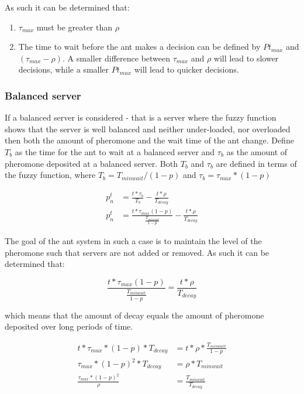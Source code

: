 As such it can be determined that:

\begin{enumerate}
	\item $\tau_{max}$ must be greater than $\rho$
	\item The time to wait before the ant makes a decision can be defined by $Pt_{max}$ and $(\tau_{max} - \rho)$. A smaller difference between $\tau_{max}$ and $\rho$ will lead to slower decisions, while a smaller $Pt_{max}$ will lead to quicker decisions.
\end{enumerate}

\subsubsection{Balanced server}

If a balanced server is considered - that is a server where the fuzzy function shows that the server is well balanced and neither under-loaded, nor overloaded then both the amount of pheromone and the wait time of the ant change. Define $T_{b}$ as the time for the ant to wait at a balanced server and $\tau_{b}$ as the amount of pheromone deposited at a balanced server. Both $T_{b}$ and $\tau_{b}$ are defined in terms of the fuzzy function, where $T_{b} = T_{minwait} / (1 - p)$ and $\tau_{b} = \tau_{max} * (1 - p)$

\begin{equation}
\begin{aligned}
p^{t}_{n} &= \frac{t *  \tau_{b}}{T_{b}} - \frac{t *  \rho}{T_{decay}} \\
p^{t}_{n} &= \frac{t *  \tau_{max}(1 - p)}{\frac{T_{minwait}}{1 - p}} - \frac{t *  \rho}{T_{decay}}
\end{aligned}
\end{equation}

The goal of the ant system in such a case is to maintain the level of the pheromone such that servers are not added or removed. As such it can be determined that:

\begin{equation}
\frac{t *  \tau_{max}(1 - p)}{\frac{T_{minwait}}{1 - p}} = \frac{t *  \rho}{T_{decay}}
\end{equation}

which means that the amount of decay equals the amount of pheromone deposited over long periods of time.

\begin{equation}
\begin{aligned}
t *  \tau_{max} * (1 - p) * T_{decay} &= t *  \rho * \frac{T_{minwait}}{1 - p} \\
\tau_{max} * (1 - p)^2 * T_{decay} &= \rho * T_{minwait} \\
\frac{\tau_{max} * (1 - p)^2}{\rho} &= \frac{T_{minwait}}{T_{decay}}
\end{aligned}
\end{equation}

